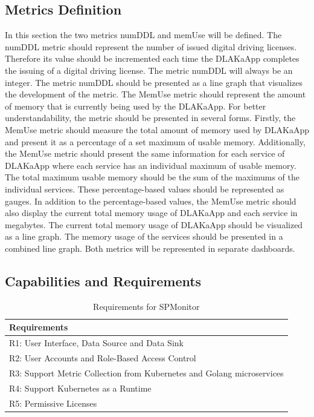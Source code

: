\subsection{Metrics Definition}

In this section the two metrics numDDL and memUse will be defined.
The numDDL metric should represent the number of issued digital driving
licenses. Therefore its value should be incremented each time the DLAKaApp
completes the issuing of a digital driving license. The metric numDDL will
always be an integer. The metric numDDL should be presented as a line graph
that visualizes the development of the metric. The MemUse metric should
represent the amount of memory that is currently being used by the DLAKaApp.
For better understandability, the metric should be presented in several forms.
Firstly, the MemUse metric should measure the total amount of memory used by
DLAKaApp and present it as a percentage of a set maximum of usable memory.
Additionally, the MemUse metric should present the same information for each
service of DLAKaApp where each service has an individual maximum of usable
memory. The total maximum usable memory should be the sum of the maximums of
the individual services. These percentage-based values should be represented as
gauges. In addition to the percentage-based values, the MemUse metric should
also display the current total memory usage of DLAKaApp and each service in
megabytes. The current total memory usage of DLAKaApp should be visualized as a
line graph. The memory usage of the services should be presented in a combined
line graph. Both metrics will be represented in separate dashboards.

\subsection{Capabilities and Requirements}

\begin{table}[]
  \centering
  \begin{tabular}{l}
    Requirements                                                           \\
    \hline
    R1: User Interface, Data Source and Data Sink                          \\
    R2: User Accounts and Role-Based Access Control                        \\
    R3: Support Metric Collection from Kubernetes and Golang microservices \\
    R4: Support Kubernetes as a Runtime                                    \\
    R5: Permissive Licenses                                                \\
  \end{tabular}
  \caption{Requirements for SPMonitor}
  \label{tab:spmonitor_requirements}
\end{table}

